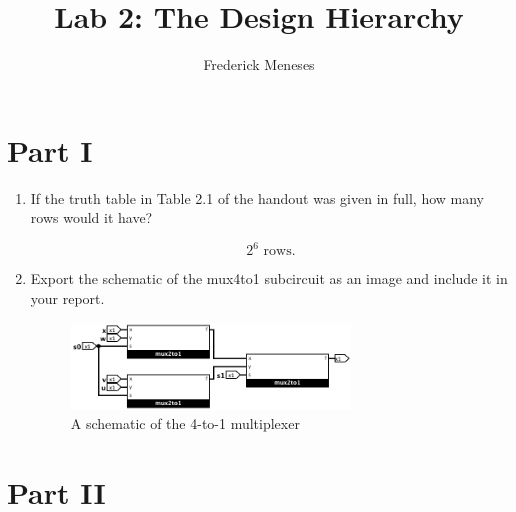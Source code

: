 \documentclass{article}
\title{Lab 2: The Design Hierarchy}
\author{Frederick Meneses}
\begin{document}
\maketitle

\section*{Part I}

\begin{enumerate}
\item If the truth table in Table 2.1 of the handout was given in full, how many rows would it have?

$$2^6 \text{ rows.}$$

\item Export the schematic of the mux4to1 subcircuit as an image and include it in your report.

\begin{figure}[ht!]
    \centering
    \includegraphics[width=0.7\textwidth]{part1.png}
    \caption{A schematic of the 4-to-1 multiplexer}
    \label{f:part1}
\end{figure}
\end{enumerate}

\section*{Part II}
\end{document}
